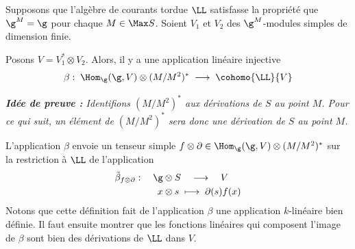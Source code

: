 \begin{annexeConj} \label{trucmargaux} Supposons que l'algèbre de courants tordue $\LL$ satisfasse la propriété que $\g^M = \g$ pour chaque $M \in \Max S$. Soient $V_1$ et $V_2$ des $\g^M$-modules simples de dimension finie. 

Posons $V = V_1^* \otimes V_2$. Alors, il y a une application linéaire injective
\begin{align*}
\beta : \; \Hom_{\g}(\g,V) \otimes (M/M^2)^* \; \longrightarrow \; \cohomo{\LL}{V}
\end{align*}

\em \textbf{Idée de preuve :} Identifions $(M/M^2)^*$ aux dérivations de $S$ au point $M$. Pour ce qui suit, un élément de $(M/M^2)^*$ sera donc une dérivation de $S$ au point $M$. 

L'application $\beta$ envoie un tenseur simple $f \otimes \partial \in \Hom_{\g}(\g,V) \otimes (M/M^2)^*$ sur la restriction à $\LL$ de l'application
\begin{align*}
\tilde{\beta}_{f \otimes \partial} : \quad \g &\otimes S \quad \longrightarrow \quad V\\
x &\otimes s \; \longmapsto \; \partial(s)f(x)
\end{align*}
Notons que cette définition fait de l'application $\beta$ une application $k$-linéaire bien définie. Il faut ensuite montrer que les fonctions linéaires qui composent l'image de $\beta$ sont bien des dérivations de $\LL$ dans $V$. 


\end{annexeConj}
